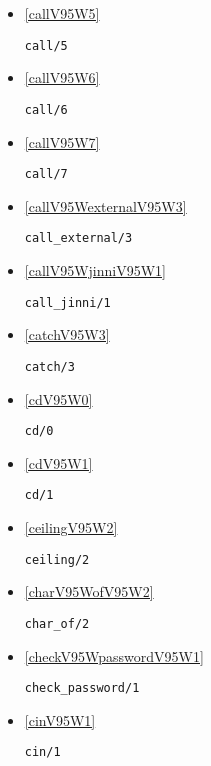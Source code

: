 \begin{itemize}
\item \ref{callV95W5} 
\begin{verbatim}
call/5
\end{verbatim}

\item \ref{callV95W6} 
\begin{verbatim}
call/6
\end{verbatim}

\item \ref{callV95W7} 
\begin{verbatim}
call/7
\end{verbatim}

\item \ref{callV95WexternalV95W3} 
\begin{verbatim}
call_external/3
\end{verbatim}

\item \ref{callV95WjinniV95W1} 
\begin{verbatim}
call_jinni/1
\end{verbatim}

\item \ref{catchV95W3} 
\begin{verbatim}
catch/3
\end{verbatim}

\item \ref{cdV95W0} 
\begin{verbatim}
cd/0
\end{verbatim}

\item \ref{cdV95W1} 
\begin{verbatim}
cd/1
\end{verbatim}

\item \ref{ceilingV95W2} 
\begin{verbatim}
ceiling/2
\end{verbatim}

\item \ref{charV95WofV95W2} 
\begin{verbatim}
char_of/2
\end{verbatim}

\item \ref{checkV95WpasswordV95W1} 
\begin{verbatim}
check_password/1
\end{verbatim}

\item \ref{cinV95W1} 
\begin{verbatim}
cin/1
\end{verbatim}


\end{itemize}
